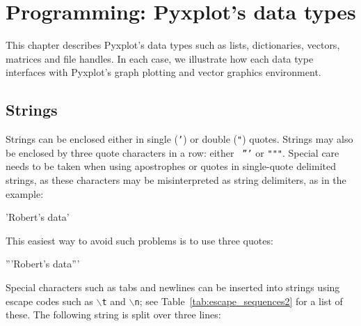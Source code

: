 %
%
%
%
%



\chapter{Programming: Pyxplot's data types}
\label{chap:progDataTypes}

This chapter describes Pyxplot's data types such as lists, dictionaries,
vectors, matrices and file handles.  In each case, we illustrate how each data
type interfaces with Pyxplot's graph plotting and vector graphics environment.

\section{Strings}
\label{sec:stringvars}

Strings can be enclosed either in single ({\tt '}) or double ({\tt "}) quotes.
Strings may also be enclosed by three quote characters in a row: either {\tt
'''} or {\tt """}. Special care needs to be taken when using apostrophes or
quotes in single-quote delimited strings, as these characters may be
misinterpreted as string delimiters, as in the example:

\begin{dontdo}
'Robert's data'
\end{dontdo}

\noindent This easiest way to avoid such problems is to use three quotes:

\begin{dodo}
'''Robert's data'''
\end{dodo}

Special characters such as tabs and newlines can be inserted into strings using
escape codes such as {\tt $\backslash$t} and {\tt $\backslash$n}; see
Table~\ref{tab:escape_sequences2} for a list of these. The following string is
split over three lines:

